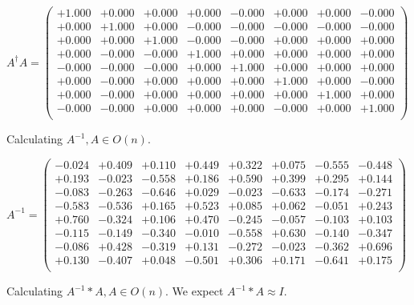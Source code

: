 \documentclass[9pt]{article}
\theoremstyle{plain}
\theoremstyle{definition}
\theoremstyle{remark}
\numberwithin{equation}{section}
\begin{document}
$A^{\dag} A = \left(
\begin{array}{
cccccccc}
+1.000 & +0.000 & +0.000 & +0.000 & -0.000 & +0.000 & +0.000 & -0.000 \\
+0.000 & +1.000 & +0.000 & -0.000 & -0.000 & -0.000 & -0.000 & -0.000 \\
+0.000 & +0.000 & +1.000 & -0.000 & -0.000 & +0.000 & +0.000 & +0.000 \\
+0.000 & -0.000 & -0.000 & +1.000 & +0.000 & +0.000 & +0.000 & +0.000 \\
-0.000 & -0.000 & -0.000 & +0.000 & +1.000 & +0.000 & +0.000 & +0.000 \\
+0.000 & -0.000 & +0.000 & +0.000 & +0.000 & +1.000 & +0.000 & -0.000 \\
+0.000 & -0.000 & +0.000 & +0.000 & +0.000 & +0.000 & +1.000 & +0.000 \\
-0.000 & -0.000 & +0.000 & +0.000 & +0.000 & -0.000 & +0.000 & +1.000 \\
\end{array}
\right)$ \newline 

Calculating $A^{-1} ,  A \in O(n)$.

$A^{-1} = \left(
\begin{array}{
cccccccc}
-0.024 & +0.409 & +0.110 & +0.449 & +0.322 & +0.075 & -0.555 & -0.448 \\
+0.193 & -0.023 & -0.558 & +0.186 & +0.590 & +0.399 & +0.295 & +0.144 \\
-0.083 & -0.263 & -0.646 & +0.029 & -0.023 & -0.633 & -0.174 & -0.271 \\
-0.583 & -0.536 & +0.165 & +0.523 & +0.085 & +0.062 & -0.051 & +0.243 \\
+0.760 & -0.324 & +0.106 & +0.470 & -0.245 & -0.057 & -0.103 & +0.103 \\
-0.115 & -0.149 & -0.340 & -0.010 & -0.558 & +0.630 & -0.140 & -0.347 \\
-0.086 & +0.428 & -0.319 & +0.131 & -0.272 & -0.023 & -0.362 & +0.696 \\
+0.130 & -0.407 & +0.048 & -0.501 & +0.306 & +0.171 & -0.641 & +0.175 \\
\end{array}
\right)$ \newline 

Calculating $A^{-1} *A  ,  A \in O(n)$.   We expect $A^{-1} *A  \approx I$. 
\end{document}
